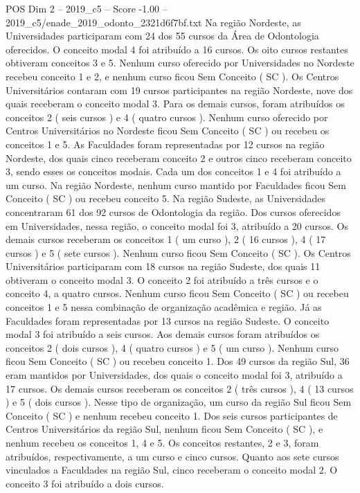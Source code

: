 \begin{textsample}{POS Dim 2 – 2019\_c5 – Score -1.00 – 2019\_c5/enade\_2019\_odonto\_2321d6f7bf.txt}
Na região Nordeste, as Universidades participaram com 24 dos 55 cursos da Área de Odontologia oferecidos.
O conceito modal 4 foi atribuído a 16 cursos.
Os oito cursos restantes obtiveram conceitos 3 e 5.
Nenhum curso oferecido por Universidades no Nordeste recebeu conceito 1 e 2, e nenhum curso ficou Sem Conceito ( SC ).
Os Centros Universitários contaram com 19 cursos participantes na região Nordeste, nove dos quais receberam o conceito modal 3.
Para os demais cursos, foram atribuídos os conceitos 2 ( seis cursos ) e 4 ( quatro cursos ).
Nenhum curso oferecido por Centros Universitários no Nordeste ficou Sem Conceito ( SC ) ou recebeu os conceitos 1 e 5.
As Faculdades foram representadas por 12 cursos na região Nordeste, dos quais cinco receberam conceito 2 e outros cinco receberam conceito 3, sendo esses os conceitos modais.
Cada um dos conceitos 1 e 4 foi atribuído a um curso.
Na região Nordeste, nenhum curso mantido por Faculdades ficou Sem Conceito ( SC ) ou recebeu conceito 5.
Na região Sudeste, as Universidades concentraram 61 dos 92 cursos de Odontologia da região.
Dos cursos oferecidos em Universidades, nessa região, o conceito modal foi 3, atribuído a 20 cursos.
Os demais cursos receberam os conceitos 1 ( um curso ), 2 ( 16 cursos ), 4 ( 17 cursos ) e 5 ( sete cursos ).
Nenhum curso ficou Sem Conceito ( SC ).
Os Centros Universitários participaram com 18 cursos na região Sudeste, dos quais 11 obtiveram o conceito modal 3.
O conceito 2 foi atribuído a três cursos e o conceito 4, a quatro cursos.
Nenhum curso ficou Sem Conceito ( SC ) ou recebeu conceitos 1 e 5 nessa combinação de organização acadêmica e região.
Já as Faculdades foram representadas por 13 cursos na região Sudeste.
O conceito modal 3 foi atribuído a seis cursos.
Aos demais cursos foram atribuídos os conceitos 2 ( dois cursos ), 4 ( quatro cursos ) e 5 ( um curso ).
Nenhum curso ficou Sem Conceito ( SC ) ou recebeu conceito 1.
Dos 49 cursos da região Sul, 36 eram mantidos por Universidades, dos quais o conceito modal foi 3, atribuído a 17 cursos.
Os demais cursos receberam os conceitos 2 ( três cursos ), 4 ( 13 cursos ) e 5 ( dois cursos ).
Nesse tipo de organização, um curso da região Sul ficou Sem Conceito ( SC ) e nenhum recebeu conceito 1.
Dos seis cursos participantes de Centros Universitários da região Sul, nenhum ficou Sem Conceito ( SC ), e nenhum recebeu os conceitos 1, 4 e 5.
Os conceitos restantes, 2 e 3, foram atribuídos, respectivamente, a um curso e cinco cursos.
Quanto aos sete cursos vinculados a Faculdades na região Sul, cinco receberam o conceito modal 2.
O conceito 3 foi atribuído a dois cursos.

\end{textsample}
